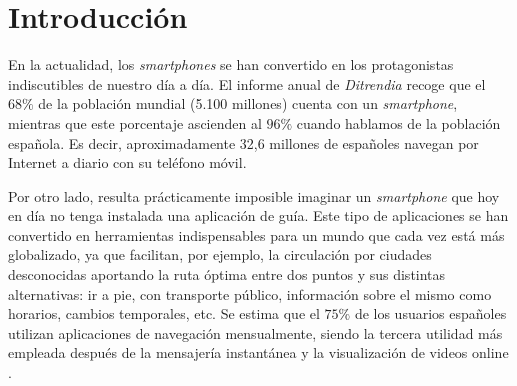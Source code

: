\chapter{Introducción}
\label{cap:introduccion}


En la actualidad, los \textit{smartphones} se han convertido en los protagonistas indiscutibles de nuestro día a día. El informe anual de \textit{Ditrendia} \citep{ditrendia2019informe} recoge que el $68\%$ de la población mundial (5.100 millones) cuenta con un \textit{smartphone}, mientras que este porcentaje ascienden al $96\%$ cuando hablamos de la población española. Es decir, aproximadamente 32,6 millones de españoles navegan por Internet a diario con su teléfono móvil. 

Por otro lado, resulta prácticamente imposible imaginar un \textit{smartphone} que hoy en día no tenga instalada una aplicación de guía. Este tipo de aplicaciones se han convertido en herramientas indispensables para un mundo que cada vez está más globalizado, ya que facilitan, por ejemplo, la circulación por ciudades desconocidas aportando la ruta óptima entre dos puntos y sus distintas alternativas: ir a pie, con transporte público, información sobre el mismo como horarios, cambios temporales, etc. Se estima que el $75\%$ de los usuarios españoles utilizan aplicaciones de navegación mensualmente, siendo la tercera utilidad más empleada después de la mensajería instantánea y la visualización de videos online \citep{ditrendia2019informe}.

